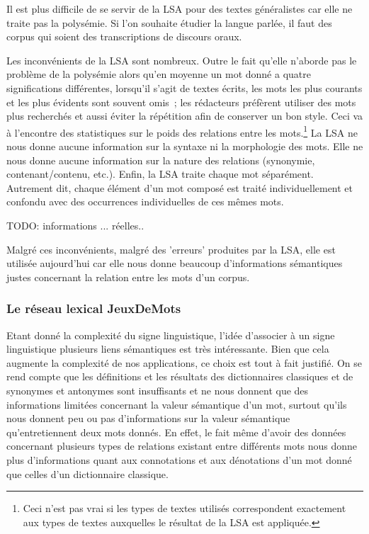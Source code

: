 \documentclass[a4paper,11pt,french]{article}
\begin{document}
Il est plus difficile de se servir de la LSA pour des textes généralistes car elle ne traite pas la polysémie. Si l'on souhaite étudier la langue parlée, il faut des corpus qui soient des transcriptions de discours oraux. 

Les inconvénients de la LSA sont nombreux. Outre le fait qu'elle n'aborde pas le problème de la polysémie alors qu'en moyenne un mot donné a quatre significations différentes, lorsqu'il s'agit de textes écrits, les mots les plus courants et les plus évidents sont souvent omis~; les rédacteurs préfèrent utiliser des mots plus recherchés et aussi éviter la répétition afin de conserver un bon style. Ceci va à l'encontre des statistiques sur le poids des relations entre les mots.\footnote{Ceci n'est pas vrai si les types de textes utilisés correspondent exactement aux types de textes auxquelles le résultat de la LSA est appliquée.} La LSA ne nous donne aucune information sur la syntaxe ni la morphologie des mots. Elle ne nous donne aucune information sur la nature des relations (synonymie, contenant/contenu, etc.). Enfin, la LSA traite chaque mot séparément. Autrement dit, chaque élément d'un mot composé est traité individuellement et confondu avec des occurrences individuelles de ces mêmes mots.

TODO: informations ... réelles..


Malgré ces inconvénients, malgré des 'erreurs' produites par la LSA, elle est utilisée aujourd'hui car elle nous donne beaucoup d'informations sémantiques justes concernant la relation entre les mots d'un corpus. 

\subsubsection{Le réseau lexical JeuxDeMots}

Etant donné la complexité du signe linguistique, l'idée d'associer à un signe linguistique plusieurs liens sémantiques est très intéressante. Bien que cela augmente la complexité de nos applications, ce choix est tout à fait justifié. On se rend compte que les définitions et les résultats des dictionnaires classiques et de synonymes et antonymes sont insuffisants et ne nous donnent que des informations limitées concernant la valeur sémantique d'un mot, surtout qu'ils nous donnent peu ou pas d'informations sur la valeur sémantique qu'entretiennent deux mots donnés. En effet, le fait même d'avoir des données concernant plusieurs types de relations existant entre différents mots nous donne plus d'informations quant aux connotations et aux dénotations d'un mot donné que celles d'un dictionnaire classique.
\end{document}
